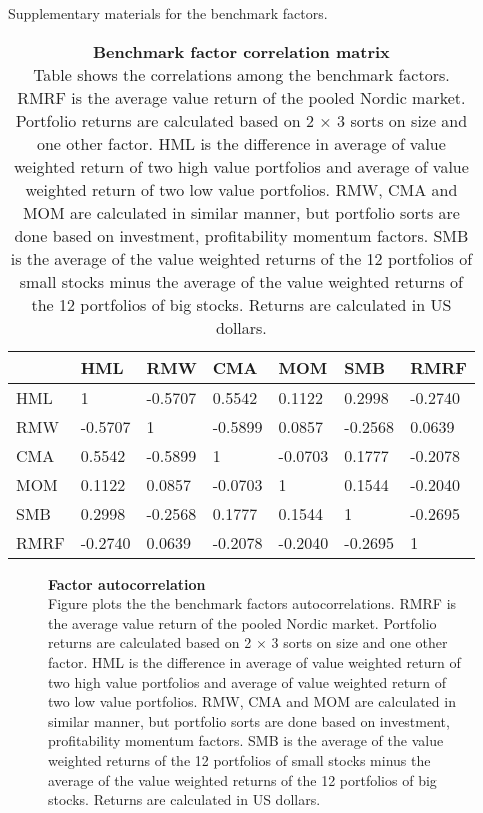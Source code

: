 \documentclass[12pt]{article}
\begin{document}
Supplementary materials for the benchmark factors. 

\begin{table}[ht]
\footnotesize
\caption[Benchmark factor correlation matrix]{\textbf{Benchmark factor correlation matrix}\\ Table shows the correlations among the benchmark factors. RMRF is the average value return of the pooled Nordic market. Portfolio returns are calculated based on 2 × 3 sorts on size and one other factor. HML is the difference in average of value weighted return of two high value portfolios and average of value weighted return of two low value portfolios. RMW, CMA and MOM are calculated in similar manner, but portfolio sorts are done based on investment, profitability momentum factors. SMB is the average of the value weighted returns of the 12 portfolios of small stocks minus the average of the value weighted returns of the 12 portfolios of big stocks. Returns are calculated in US dollars.}
\label{table:FFfactorsCorrelations}
\centering
{}
\begin{tabularx}{\textwidth}{@{\extracolsep{4pt}} X Y Y Y Y Y Y} 
\toprule
& HML & RMW & CMA & MOM & SMB & RMRF \\
\midrule
HML & 1 & -0.5707 & 0.5542 & 0.1122 & 0.2998 & -0.2740 \\
RMW & -0.5707 & 1 & -0.5899 & 0.0857 & -0.2568 & 0.0639 \\
CMA & 0.5542 & -0.5899 & 1 & -0.0703 & 0.1777 & -0.2078 \\
MOM & 0.1122 & 0.0857 & -0.0703 & 1 & 0.1544 & -0.2040 \\
SMB & 0.2998 & -0.2568 & 0.1777 & 0.1544 & 1 & -0.2695 \\
RMRF & -0.2740 & 0.0639 & -0.2078 & -0.2040 & -0.2695 & 1 \\
\bottomrule
\end{tabularx}
\end{table}

\begin{figure}[ht]
\centering
\caption[Factor autocorrelation]{\textbf{Factor autocorrelation}\\ Figure plots the the benchmark factors autocorrelations. RMRF is the average value return of the pooled Nordic market. Portfolio returns are calculated based on 2 × 3 sorts on size and one other factor. HML is the difference in average of value weighted return of two high value portfolios and average of value weighted return of two low value portfolios. RMW, CMA and MOM are calculated in similar manner, but portfolio sorts are done based on investment, profitability momentum factors. SMB is the average of the value weighted returns of the 12 portfolios of small stocks minus the average of the value weighted returns of the 12 portfolios of big stocks. Returns are calculated in US dollars.}

\label{plot:factor_autocorrelation}
\end{figure}
\end{document}
